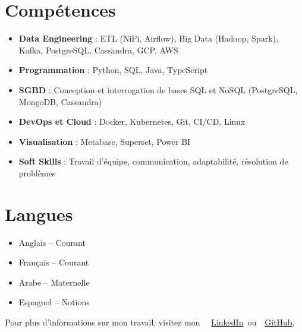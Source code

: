\documentclass[10pt,a4paper,sans]{moderncv}
\begin{document}
  \section{\fontsize{11}{12.1}\selectfont Compétences}
  \vspace{-6pt}
  \begin{itemize}[leftmargin=0.3cm, itemsep=-2pt, topsep=0pt, partopsep=0pt, parsep=0pt]
    \item \textbf{Data Engineering} : ETL (NiFi, Airflow), Big Data (Hadoop, Spark), Kafka, PostgreSQL, Cassandra, GCP, AWS
    \item \textbf{Programmation} : Python, SQL, Java, TypeScript
    \item \textbf{SGBD} : Conception et interrogation de bases SQL et NoSQL (PostgreSQL, MongoDB, Cassandra)
    \item \textbf{DevOps et Cloud} : Docker, Kubernetes, Git, CI/CD, Linux
    \item \textbf{Visualisation} : Metabase, Superset, Power BI
    \item \textbf{Soft Skills} : Travail d’équipe, communication, adaptabilité, résolution de problèmes
  \end{itemize}

  \vspace{-18pt}
  \section{\fontsize{11}{12.1}\selectfont Langues}
  \vspace{-17pt}
  \begin{multicols}{2}
  \begin{itemize}[leftmargin=0.3cm, itemsep=-2pt, topsep=0pt, partopsep=0pt, parsep=0pt]
      \item Anglais – Courant
      \item Français – Courant
      \item Arabe – Maternelle
      \item Espagnol – Notions
  \end{itemize}
  \end{multicols}


  \vspace{-20pt}
  \begin{center}
      {\fontsize{9}{11}\selectfont\color{gray}
      Pour plus d'informations sur mon travail, visitez mon~
      \faLinkedin~\href{https://www.linkedin.com/in/ahmed-makroum/}{LinkedIn}~ou~\faGithub~\href{https://github.com/ahmedmakroum}{GitHub}.}
  \end{center}

  
\end{document}
